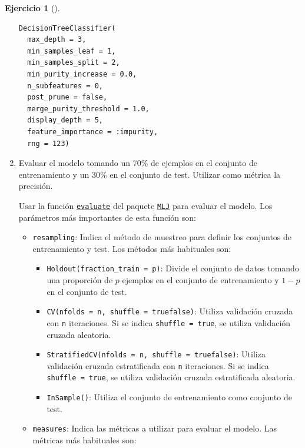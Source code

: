 \documentclass[
  a4paper,
]{scrreport}
\providecommand{\tightlist}{%
  \setlength{\itemsep}{0pt}\setlength{\parskip}{0pt}}\usepackage{longtable,booktabs,array}
\theoremstyle{definition}
\newtheorem{exercise}{Ejercicio}[chapter]
\theoremstyle{remark}
\begin{document}
\begin{exercise}[]
\begin{enumerate}
\begin{tcolorbox}
\begin{verbatim}
DecisionTreeClassifier(
  max_depth = 3, 
  min_samples_leaf = 1, 
  min_samples_split = 2, 
  min_purity_increase = 0.0, 
  n_subfeatures = 0, 
  post_prune = false, 
  merge_purity_threshold = 1.0, 
  display_depth = 5, 
  feature_importance = :impurity, 
  rng = 123)
\end{verbatim}

  \end{tcolorbox}
\item
  Evaluar el modelo tomando un 70\% de ejemplos en el conjunto de
  entrenamiento y un 30\% en el conjunto de test. Utilizar como métrica
  la precisión.

  \begin{tcolorbox}[enhanced jigsaw, toptitle=1mm, breakable, toprule=.15mm, opacitybacktitle=0.6, coltitle=black, titlerule=0mm, arc=.35mm, title=\textcolor{quarto-callout-note-color}{\faInfo}\hspace{0.5em}{Ayuda}, rightrule=.15mm, opacityback=0, colback=white, bottomrule=.15mm, leftrule=.75mm, colbacktitle=quarto-callout-note-color!10!white, bottomtitle=1mm, colframe=quarto-callout-note-color-frame, left=2mm]

  Usar la función
  \href{https://juliaai.github.io/MLJ.jl/stable/evaluating_model_performance/\#MLJBase.evaluate!}{\texttt{evaluate}}
  del paquete \href{https://juliaai.github.io/MLJ.jl/}{\texttt{MLJ}}
  para evaluar el modelo. Los parámetros más importantes de esta función
  son:

  \begin{itemize}
  \tightlist
  \item
    \texttt{resampling}: Indica el método de muestreo para definir los
    conjuntos de entrenamiento y test. Los métodos más habituales son:

    \begin{itemize}
    \tightlist
    \item
      \texttt{Holdout(fraction\_train\ =\ p)}: Divide el conjunto de
      datos tomando una proporción de \(p\) ejemplos en el conjunto de
      entrenamiento y \(1-p\) en el conjunto de test.
    \item
      \texttt{CV(nfolds\ =\ n,\ shuffle\ =\ true\textbar{}false)}:
      Utiliza validación cruzada con \texttt{n} iteraciones. Si se
      indica \texttt{shuffle\ =\ true}, se utiliza validación cruzada
      aleatoria.
    \item
      \texttt{StratifiedCV(nfolds\ =\ n,\ shuffle\ =\ true\textbar{}false)}:
      Utiliza validación cruzada estratificada con \texttt{n}
      iteraciones. Si se indica \texttt{shuffle\ =\ true}, se utiliza
      validación cruzada estratificada aleatoria.
    \item
      \texttt{InSample()}: Utiliza el conjunto de entrenamiento como
      conjunto de test.
    \end{itemize}
  \item
    \texttt{measures}: Indica las métricas a utilizar para evaluar el
    modelo. Las métricas más habituales son:


\end{itemize}
\end{tcolorbox}
\end{enumerate}
\end{exercise}
\end{document}
